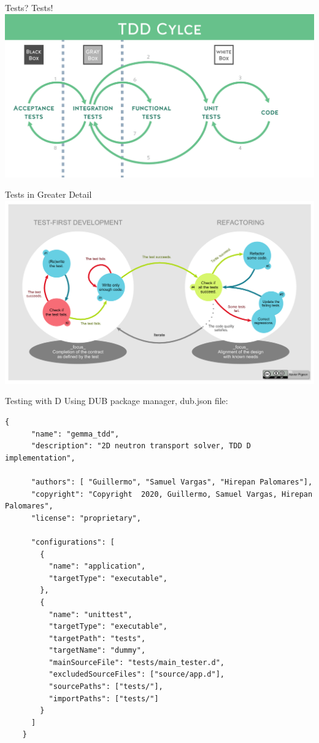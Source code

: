 \documentclass[sans,mathserif,aspectratio=169]{beamer}
\begin{document}
\begin{frame}{Tests? Tests!}
\centering
\includegraphics[width=0.85\linewidth]{tdd.png}
\end{frame}

\begin{frame}{Tests in Greater Detail}
\centering
\includegraphics[width=0.85\linewidth]{tests.png}
\end{frame}

\begin{frame}[fragile]{Testing with D}
  \small
  Using DUB package manager, dub.json file:
  \begin{lstlisting}[frame=single, backgroundcolor=\color{background}, basicstyle=\tiny, keepspaces=true]
    {
      "name": "gemma_tdd",
      "description": "2D neutron transport solver, TDD D implementation",

      "authors": [ "Guillermo", "Samuel Vargas", "Hirepan Palomares"],
      "copyright": "Copyright  2020, Guillermo, Samuel Vargas, Hirepan Palomares",
      "license": "proprietary",

      "configurations": [
        {
          "name": "application",
          "targetType": "executable",
        },
        {
          "name": "unittest",
          "targetType": "executable",
          "targetPath": "tests",
          "targetName": "dummy",
          "mainSourceFile": "tests/main_tester.d",
          "excludedSourceFiles": ["source/app.d"],
          "sourcePaths": ["tests/"],
          "importPaths": ["tests/"]
        }
      ]
    }
  \end{lstlisting}
\end{frame}
\end{document}
